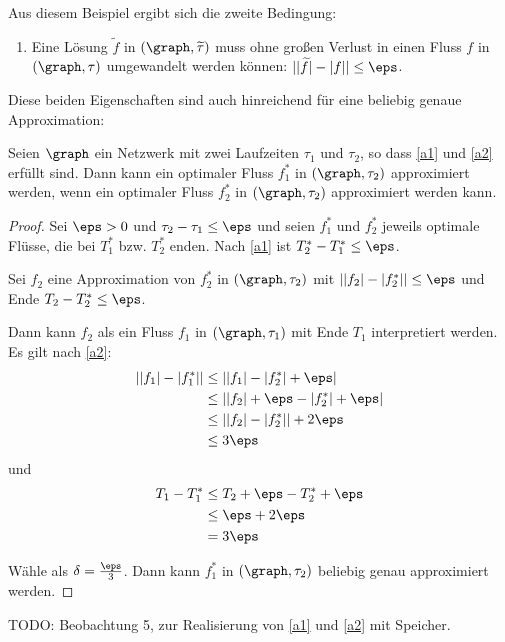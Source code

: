 Aus diesem Beispiel ergibt sich die zweite Bedingung:
\begin{framed}
\begin{enumerate}[start=2, label={(A\arabic*)}]
    \item Eine Lösung $\widetilde{f}$ in $(\graph, \widetilde{\tau})$ muss
        ohne großen Verlust in einen Fluss $f$ in $(\graph, \tau)$
        umgewandelt werden können: $||\widetilde{f}| - |f|| \leq \eps$.
        \label{a2}
\end{enumerate}
\end{framed}

Diese beiden Eigenschaften sind auch hinreichend für eine beliebig genaue
Approximation:
\begin{corollary}
    Seien $\graph$ ein Netzwerk mit zwei Laufzeiten $\tau_1$ und $\tau_2$, so dass
    \ref{a1} und \ref{a2} erfüllt sind.
    Dann kann ein optimaler Fluss $f_1^*$ in $(\graph, \tau_2)$ approximiert werden,
    wenn ein optimaler Fluss $f_2^*$ in $(\graph, \tau_2)$ approximiert werden kann.

    \begin{proof}    
        Sei $\eps > 0$ und $\tau_2 - \tau_1 \leq \eps$ und seien
        $f_1^*$ und $f_2^*$ jeweils optimale Flüsse, die bei
        $T_1^*$ bzw. $T_2^*$ enden. Nach \ref{a1} ist $T_2^* - T_1^*\leq \eps$.

        Sei $f_2$ eine Approximation von $f_2^*$ in $(\graph, \tau_2)$ mit
        $||f_2| - |f_2^*|| \leq \eps$ und Ende $T_2 - T_2^* \leq \eps$.

        Dann kann $f_2$ als ein Fluss $f_1$ in $(\graph, \tau_1)$
        mit Ende $T_1$ interpretiert werden. Es gilt nach \ref{a2}:
        \begin{align*}
            ||f_1| - |f_1^*|| & \leq ||f_1| - |f_2^*| + \eps| \\
                            & \leq ||f_2| + \eps - |f_2^*| + \eps| \\
                            & \leq ||f_2| - |f_2^*|| + 2 \eps \\
                            & \leq 3 \eps
        \end{align*}
        und
        \begin{align*}
            T_1 - T_1^*  & \leq T_2 + \eps - T_2^* + \eps \\
                & \leq \eps + 2\eps \\
                & = 3 \eps
        \end{align*}
        
        Wähle als $\delta = \frac{\eps}{3}$. Dann kann $f_1^*$ in
        $(\graph, \tau_2)$ beliebig genau approximiert werden.
    \end{proof}
\end{corollary}

\begin{observation}
    TODO: Beobachtung 5, zur Realisierung von \ref{a1} und \ref{a2} mit Speicher.
\end{observation}


